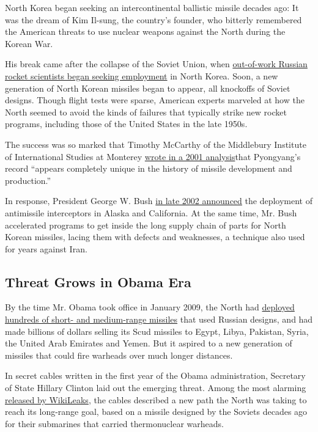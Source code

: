 North Korea began seeking an intercontinental ballistic missile decades
ago: It was the dream of Kim Il-sung, the country's founder, who
bitterly remembered the American threats to use nuclear weapons against
the North during the Korean War.

His break came after the collapse of the Soviet Union, when
\href{https://www.nytimes.com/2016/09/10/science/north-korea-nuclear-weapons.html}{out-of-work
Russian rocket scientists began seeking employment} in North Korea.
Soon, a new generation of North Korean missiles began to appear, all
knockoffs of Soviet designs. Though flight tests were sparse, American
experts marveled at how the North seemed to avoid the kinds of failures
that typically strike new rocket programs, including those of the United
States in the late 1950s.

The success was so marked that Timothy McCarthy of the Middlebury
Institute of International Studies at Monterey
\href{http://calhoun.nps.edu/bitstream/handle/10945/40268/inc_barletta_op6.pdf?sequence=1\&isAllowed=y}{wrote
in a 2001 analysis}that Pyongyang's record ``appears completely unique
in the history of missile development and production.''

In response, President George W. Bush
\href{http://www.nytimes.com/2002/12/18/world/threats-responses-defense-antimissile-system-limited-form-ordered-bush.html}{in
late 2002 announced} the deployment of antimissile interceptors in
Alaska and California. At the same time, Mr. Bush accelerated programs
to get inside the long supply chain of parts for North Korean missiles,
lacing them with defects and weaknesses, a technique also used for years
against Iran.

\hypertarget{threat-grows-in-obama-era}{%
\subsection{Threat Grows in Obama Era}\label{threat-grows-in-obama-era}}

By the time Mr. Obama took office in January 2009, the North had
\href{https://www.nonproliferation.org/wp-content/uploads/npr/npr_18-2_pollack_ballistic-trajectory.pdf}{deployed
hundreds of short- and medium-range missiles} that used Russian designs,
and had made billions of dollars selling its Scud missiles to Egypt,
Libya, Pakistan, Syria, the United Arab Emirates and Yemen. But it
aspired to a new generation of missiles that could fire warheads over
much longer distances.

In secret cables written in the first year of the Obama administration,
Secretary of State Hillary Clinton laid out the emerging threat. Among
the most alarming
\href{http://www.nytimes.com/interactive/world/statessecrets.html}{released
by WikiLeaks}, the cables described a new path the North was taking to
reach its long-range goal, based on a missile designed by the Soviets
decades ago for their submarines that carried thermonuclear warheads.

